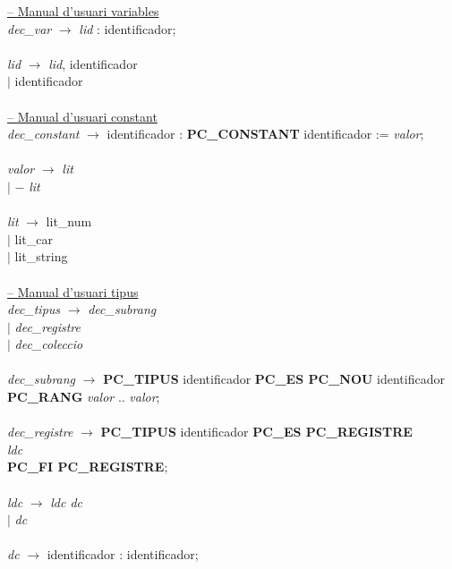 \begin{tabbing}
        \underline{-- Manual d'usuari variables} \\
        \textit{dec\_var} \> $\rightarrow$ \> \textit{lid} : identificador; \\
        \\
        \textit{lid} \> $\rightarrow$ \> \textit{lid}, identificador \\
        \> $\mid$ \> identificador \\
        \\
        
        \underline{-- Manual d'usuari constant} \\
        \textit{dec\_constant} \> $\rightarrow$ \> identificador : \textbf{PC\_CONSTANT} identificador := \textit{valor};  \\
        \\
        \textit{valor} \> $\rightarrow$ \> \textit{lit} \\
        \> $\mid$ \> $-$ \textit{lit} \\
        \\
        \textit{lit} \> $\rightarrow$ \> lit\_num \\
        \> $\mid$ \> lit\_car \\
        \> $\mid$ \> lit\_string \\
        \\
        
        \underline{-- Manual d'usuari tipus} \\
        \textit{dec\_tipus} \> $\rightarrow$ \> \textit{dec\_subrang}  \\
        \> $\mid$ \> \textit{dec\_registre} \\
        \> $\mid$ \> \textit{dec\_coleccio} \\
        \\
        \textit{dec\_subrang} \> $\rightarrow$ \> \textbf{PC\_TIPUS} identificador \textbf{PC\_ES PC\_NOU} identificador 
			\\\> \textbf{PC\_RANG} \textit{valor} .. \textit{valor}; \\
        \\
        \textit{dec\_registre} \> $\rightarrow$ \> \textbf{PC\_TIPUS} identificador \textbf{PC\_ES PC\_REGISTRE} \\
        \> \> \> \textit{ldc} \\
        \> \> \textbf{PC\_FI PC\_REGISTRE}; \\
        \\
        \textit{ldc} \> $\rightarrow$ \> \textit{ldc dc} \\
        \> $\mid$ \> \textit{dc} \\
        \\
        \textit{dc} \> $\rightarrow$ \> identificador : identificador; \\
        \\
        

\end{tabbing}
